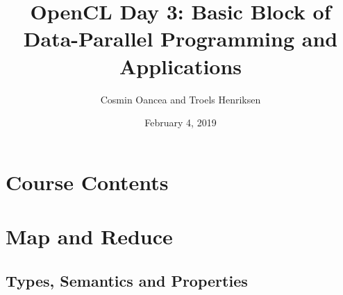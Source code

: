 \documentclass{beamer}
\title{OpenCL Day 3: Basic Block of Data-Parallel Programming and Applications}
\author{Cosmin Oancea and Troels Henriksen}
\date{February 4, 2019}
\begin{document}
\frame{\titlepage}

\section{Course Contents}

\begin{frame}
  \tableofcontents
\end{frame}


\section{Map and Reduce}

\subsection{Types, Semantics and Properties}
\end{document}
